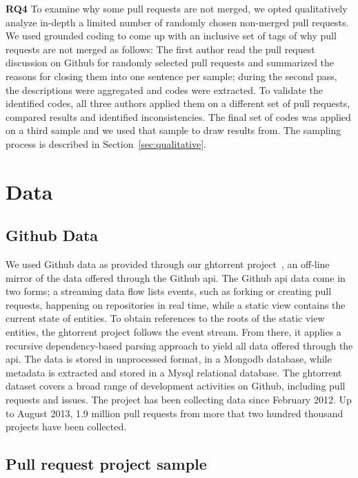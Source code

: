 \documentclass{sig-alternate}
\begin{document}
{\bfseries RQ4} To examine why some pull requests are not merged, we opted
qualitatively analyze in-depth a limited number of randomly chosen non-merged
pull requests. We used grounded coding to come up with an inclusive set of tags
of why pull requests are not merged as follows: The first author read the pull
request discussion on Github for randomly selected pull requests and summarized
the reasons for closing them into one sentence per sample; during the second
pass, the descriptions were aggregated and codes were extracted. To validate the
identified codes, all three authors applied them on a different set of pull
requests, compared results and identified inconsistencies.  The final set of
codes was applied on a third sample and we used that sample to draw results
from. The sampling process is described in Section~\ref{sec:qualitative}.

\section{Data}

\subsection{Github Data}
\label{sec:ghtorrent}

We used Github data as provided through our {\sc ght}orrent project~\cite{G13},
an off-line mirror of the data
offered through the Github {\sc api}. The Github {\sc api} 
data come in two forms; a streaming
data flow lists events, such as forking or creating pull requests, happening on
repositories in real time, while a static view contains the current state of
entities. To obtain references to the roots of the static view entities, the
{\sc ght}orrent project follows the event stream. From there, it applies a
recursive dependency-based parsing approach to yield all data offered through
the {\sc api}. The data is stored in unprocessed format, in a Mongo{\sc db}
database, while metadata is extracted and stored in a My{\sc sql} relational
database. The {\sc ght}orrent dataset covers a broad range of development
activities on Github, including pull requests and issues. The project
has been collecting data since February 2012. Up to August 2013,
1.9 million pull requests from more that two hundred thousand projects
have been collected.

\subsection{Pull request project sample}
\label{sec:expdata} 
\end{document}
